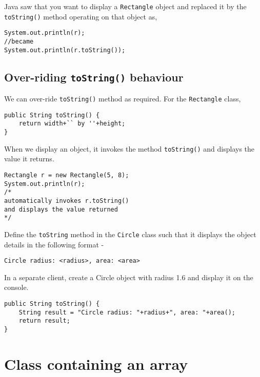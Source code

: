 Java saw that you want to display a \texttt{Rectangle} object and replaced it by the \texttt{toString()} method operating on that object as,

\begin{lstlisting}
System.out.println(r);
//became
System.out.println(r.toString()); 
\end{lstlisting}

\subsection{Over-riding \texttt{toString()} behaviour}

We can over-ride \texttt{toString()} method as required. For the \texttt{Rectangle} class,

\begin{lstlisting}
public String toString() {
    return width+`` by ''+height;
}
\end{lstlisting}

When we display an object, it invokes the method \texttt{toString()} and displays the value it returns.

\begin{lstlisting}
Rectangle r = new Rectangle(5, 8);
System.out.println(r);
/*
automatically invokes r.toString() 
and displays the value returned
*/
\end{lstlisting}

\begin{exercise}
Define the \texttt{toString} method in the \texttt{Circle} class such that it displays the object details in the following format -

\begin{verbatim}
Circle radius: <radius>, area: <area>
\end{verbatim}

In a separate client, create a Circle object with radius 1.6 and display it on the console.
\end{exercise}
\begin{answer} \begin{lstlisting}
public String toString() {
	String result = "Circle radius: "+radius+", area: "+area();
	return result;
}	
\end{lstlisting} \end{answer}

\section{Class containing an array}

